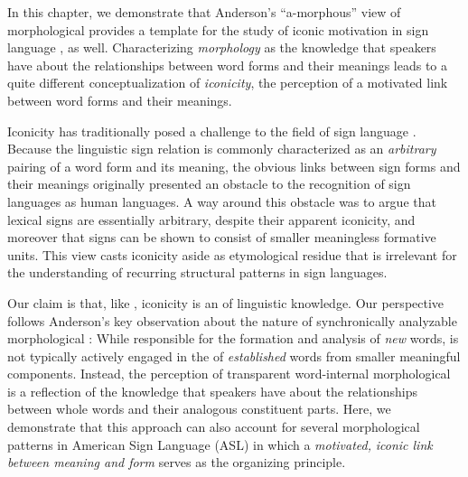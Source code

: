 \documentclass[output=paper,
modfonts
]{LSP/langsci}
\begin{document}
  In this chapter, we demonstrate that Anderson's ``a-morphous'' view of morphological  provides a template for the study of iconic motivation in sign language , as well. Characterizing \textit{morphology} as the knowledge that speakers have about the relationships between word forms and their meanings leads to a quite different conceptualization of \textit{iconicity}, the perception of a motivated link between word forms and their meanings.

  Iconicity has traditionally posed a challenge to the field of sign language . Because the linguistic sign relation is commonly characterized as an \textit{arbitrary} pairing of a word form and its meaning, the obvious links between sign forms and their meanings originally presented an obstacle to the recognition of sign languages as  human languages. A way around this obstacle was to argue that lexical signs are essentially arbitrary, despite their apparent iconicity, and moreover that signs can be shown to consist of smaller meaningless formative units. This view casts iconicity aside as etymological residue that is irrelevant for the understanding of recurring structural patterns in sign languages.

  Our claim is that, like , iconicity is an  of linguistic knowledge. Our perspective follows Anderson's \citeyearpar{anderson1992} key observation about the nature of synchronically analyzable morphological : While responsible for the formation and analysis of \textit{new} words,   is not typically actively engaged in the  of \textit{established} words from smaller meaningful components. Instead, the perception of transparent word-internal morphological  is a reflection of the knowledge that speakers have about the relationships between whole words and their analogous constituent parts. Here, we demonstrate that this approach can also account for several morphological patterns in American Sign Language (ASL) in which a \textit{motivated,} \textit{iconic link between meaning and form} serves as the organizing principle.
\end{document}

